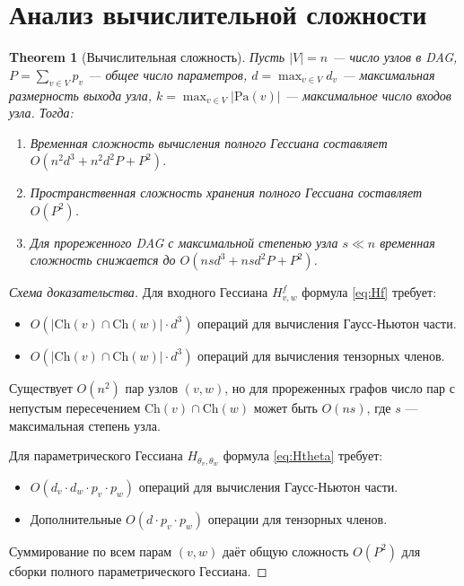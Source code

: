 \documentclass[11pt]{article}
\newtheorem{theorem}{Theorem}
\newcommand{\Pa}{\mathrm{Pa}} %
\newcommand{\Ch}{\mathrm{Ch}} %
\begin{document}
\section{Анализ вычислительной сложности}

\begin{theorem}[Вычислительная сложность]
  Пусть $|V|=n$ — число узлов в DAG, $P = \sum_{v \in V} p_v$ — общее число параметров, $d = \max_{v \in V}
  d_v$ — максимальная размерность выхода узла, $k = \max_{v \in V} |\Pa(v)|$ — максимальное число входов узла. Тогда:

  \begin{enumerate}
    \item Временная сложность вычисления полного Гессиана составляет $O(n^2 d^3 + n^2 d^2 P + P^2)$.
    \item Пространственная сложность хранения полного Гессиана составляет $O(P^2)$.
    \item Для прореженного DAG с максимальной степенью узла $s \ll n$ временная сложность снижается до $O(n s
      d^3 + n s d^2 P + P^2)$.
  \end{enumerate}
\end{theorem}

\begin{proof}[Схема доказательства]
  Для входного Гессиана $H^f_{v,w}$ формула \eqref{eq:Hf} требует:
  \begin{itemize}
    \item $O(|\Ch(v) \cap \Ch(w)| \cdot d^3)$ операций для вычисления Гаусс-Ньютон части.
    \item $O(|\Ch(v) \cap \Ch(w)| \cdot d^3)$ операций для вычисления тензорных членов.
  \end{itemize}

  Существует $O(n^2)$ пар узлов $(v,w)$, но для прореженных графов число пар с непустым пересечением $\Ch(v)
  \cap \Ch(w)$ может быть $O(n s)$, где $s$ — максимальная степень узла.

  Для параметрического Гессиана $H_{\theta_v,\theta_w}$ формула \eqref{eq:Htheta} требует:
  \begin{itemize}
    \item $O(d_v \cdot d_w \cdot p_v \cdot p_w)$ операций для вычисления Гаусс-Ньютон части.
    \item Дополнительные $O(d \cdot p_v \cdot p_w)$ операции для тензорных членов.
  \end{itemize}

  Суммирование по всем парам $(v,w)$ даёт общую сложность $O(P^2)$ для сборки полного параметрического Гессиана.
\end{proof}
\end{document}
